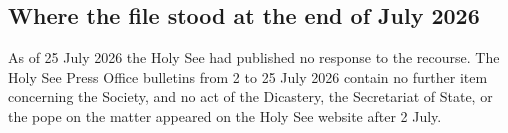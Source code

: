 \subsection{Where the file stood at the end of July 2026}

As of 25 July 2026 the Holy See had published no response to the
recourse. The Holy See Press Office bulletins from 2 to 25 July 2026
contain no further item concerning the Society, and no act of the
Dicastery, the Secretariat of State, or the pope on the matter appeared
on the Holy See website after 2 July.
